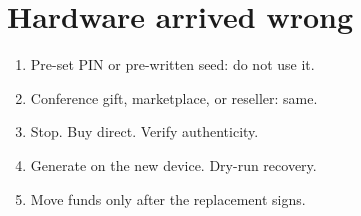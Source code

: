 \section{Hardware arrived wrong}

\begin{enumerate}
  \item Pre-set PIN or pre-written seed: do not use it.
  \item Conference gift, marketplace, or reseller:
  same.
  \item Stop. Buy direct. Verify authenticity.
  \item Generate on the new device. Dry-run recovery.
  \item Move funds only after the replacement signs.
\end{enumerate}
